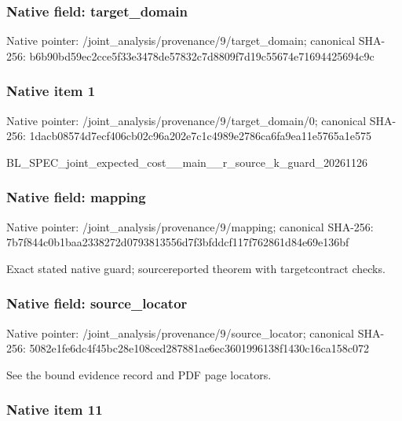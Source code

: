 \documentclass[10pt,a4paper]{article}
\begin{document}
\subsubsection{Native field: target\_domain}


Native pointer: /joint\_analysis/provenan\allowbreak{}ce/9/target\_domain; canonical SHA-256: b6b90bd59ec2cce5f33e3478\allowbreak{}de57832c7d8809f7d19c5567\allowbreak{}4e71694425694c9c



\subsubsection{Native item 1}


Native pointer: /joint\_analysis/provenan\allowbreak{}ce/9/target\_domain/0; canonical SHA-256: 1dacb08574d7ecf406cb02c9\allowbreak{}6a202e7c1c4989e2786ca6fa\allowbreak{}9ea11e5765a1e575


BL\_SPEC\_joint\_expected\_c\allowbreak{}ost\_\_main\_\_r\_source\_k\_gu\allowbreak{}ard\_20261126


\subsubsection{Native field: mapping}


Native pointer: /joint\_analysis/provenance/9/mapping; canonical SHA-256: 7b7f844c0b1baa2338272d07\allowbreak{}93813556d7f3bfddcf117f76\allowbreak{}2861d84e69e136bf


Exact stated native guard; sourcereported theorem with targetcontract checks.


\subsubsection{Native field: source\_locator}


Native pointer: /joint\_analysis/provenan\allowbreak{}ce/9/source\_locator; canonical SHA-256: 5082e1fe6dc4f45bc28e108c\allowbreak{}ed287881ae6ec3601996138f\allowbreak{}1430c16ca158c072


See the bound evidence record and PDF page locators.


\subsubsection{Native item 11}
\end{document}
